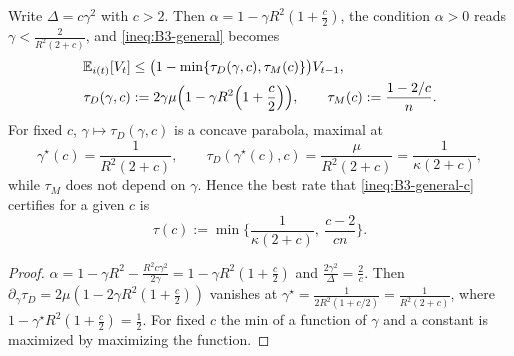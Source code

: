 \begin{corollary}[parametrization $\Delta=c\gamma^2$]\label{cor:B3-c}
Write $\Delta=c\gamma^2$ with $c>2$. Then $\alpha=1-\gamma R^2(1+\frac c2)$, the condition $\alpha>0$ reads $\gamma<\frac{2}{R^2(2+c)}$, and \eqref{ineq:B3-general} becomes
\begin{equation}\label{ineq:B3-general-c}
\begin{aligned}
\mathbb{E}_{i(t)}[V_t]&\le\big(1-\min\{\tau_D(\gamma,c),\tau_M(c)\}\big)V_{t-1},\\
\tau_D(\gamma,c)&:=2\gamma\mu\Big(1-\gamma R^2\Big(1+\frac c2\Big)\Big),\qquad
\tau_M(c):=\frac{1-2/c}{n}.
\end{aligned}
\end{equation}
For fixed $c$, $\gamma\mapsto\tau_D(\gamma,c)$ is a concave parabola, maximal at
\[
\gamma^\star(c)=\frac{1}{R^2(2+c)},\qquad \tau_D(\gamma^\star(c),c)=\frac{\mu}{R^2(2+c)}=\frac{1}{\kappa(2+c)} ,
\]
while $\tau_M$ does not depend on $\gamma$. Hence the best rate that \eqref{ineq:B3-general-c} certifies for a given $c$ is
\[
\tau(c):=\min\Big\{\frac1{\kappa(2+c)},\ \frac{c-2}{cn}\Big\}.
\]
\end{corollary}
\begin{proof}
$\alpha=1-\gamma R^2-\frac{R^2c\gamma^2}{2\gamma}=1-\gamma R^2(1+\frac c2)$ and $\frac{2\gamma^2}{\Delta}=\frac2c$. Then $\partial_\gamma\tau_D=2\mu(1-2\gamma R^2(1+\frac c2))$ vanishes at $\gamma^\star=\frac1{2R^2(1+c/2)}=\frac1{R^2(2+c)}$, where $1-\gamma^\star R^2(1+\frac c2)=\frac12$. For fixed $c$ the min of a function of $\gamma$ and a constant is maximized by maximizing the function.
\end{proof}

